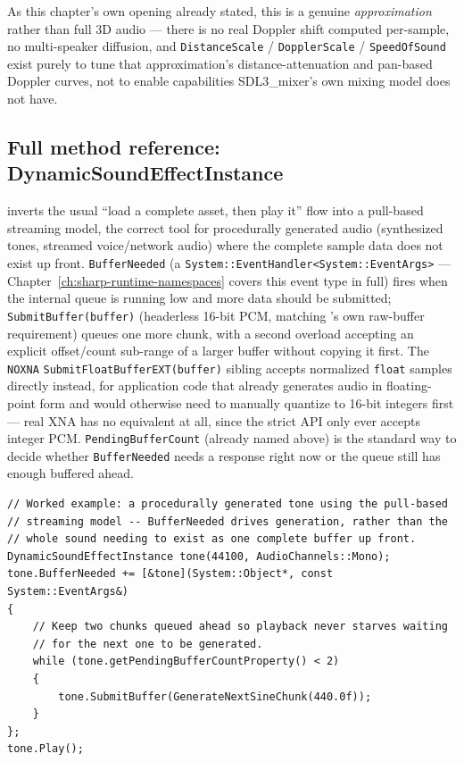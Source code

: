 As this chapter's own opening already stated, this is a genuine \emph{approximation} rather
than full 3D audio --- there is no real Doppler shift computed per-sample, no multi-speaker
diffusion, and \texttt{DistanceScale} / \texttt{DopplerScale} / \texttt{SpeedOfSound} exist purely
to tune that approximation's distance-attenuation and pan-based Doppler curves, not to enable
capabilities SDL3\_mixer's own mixing model does not have.

\subsection{Full method reference: DynamicSoundEffectInstance}

 inverts the usual ``load a complete asset, then play
it'' flow into a pull-based streaming model, the correct tool for procedurally generated audio
(synthesized tones, streamed voice/network audio) where the complete sample data does not
exist up front. \texttt{BufferNeeded} (a \texttt{System::EventHandler<System::EventArgs>} ---
Chapter~\ref{ch:sharp-runtime-namespaces} covers this event type in full) fires when the internal queue is running low and
more data should be submitted; \texttt{SubmitBuffer(buffer)} (headerless 16-bit PCM, matching
's own raw-buffer requirement) queues one more chunk, with a second
overload accepting an explicit offset/count sub-range of a larger buffer without copying it
first. The \texttt{NOXNA} \texttt{SubmitFloatBufferEXT(buffer)} sibling accepts normalized
\texttt{float} samples directly instead, for application code that already generates audio in
floating-point form and would otherwise need to manually quantize to 16-bit integers first ---
real XNA has no equivalent at all, since the strict API only ever accepts integer PCM.
\texttt{PendingBufferCount} (already named above) is the standard way to decide whether
\texttt{BufferNeeded} needs a response right now or the queue still has enough buffered ahead.

\begin{lstlisting}
// Worked example: a procedurally generated tone using the pull-based
// streaming model -- BufferNeeded drives generation, rather than the
// whole sound needing to exist as one complete buffer up front.
DynamicSoundEffectInstance tone(44100, AudioChannels::Mono);
tone.BufferNeeded += [&tone](System::Object*, const System::EventArgs&)
{
    // Keep two chunks queued ahead so playback never starves waiting
    // for the next one to be generated.
    while (tone.getPendingBufferCountProperty() < 2)
    {
        tone.SubmitBuffer(GenerateNextSineChunk(440.0f));
    }
};
tone.Play();
\end{lstlisting}

